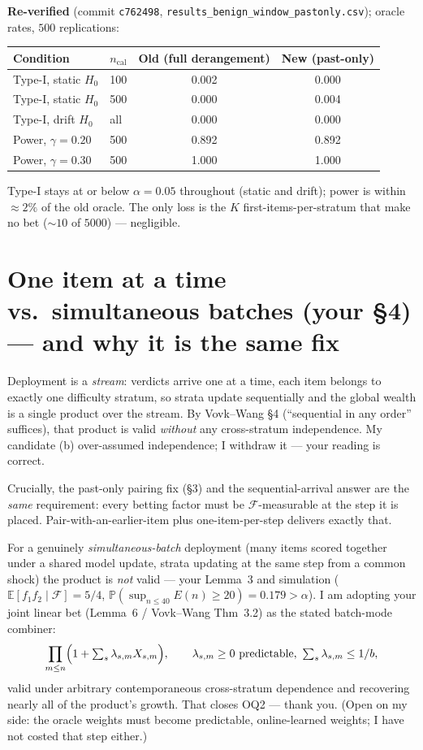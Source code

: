 \documentclass[11pt]{article}
\begin{document}
\textbf{Re-verified} (commit \texttt{c762498}, \texttt{results\_benign\_window\_pastonly.csv}); oracle rates, $500$ replications:
\begin{center}
\begin{tabular}{llcc}
\toprule
Condition & $n_{\mathrm{cal}}$ & Old (full derangement) & New (past-only) \\
\midrule
Type-I, static $H_0$ & 100 & 0.002 & 0.000 \\
Type-I, static $H_0$ & 500 & 0.000 & 0.004 \\
Type-I, drift $H_0$  & all & 0.000 & 0.000 \\
Power, $\gamma=0.20$ & 500 & 0.892 & 0.892 \\
Power, $\gamma=0.30$ & 500 & 1.000 & 1.000 \\
\bottomrule
\end{tabular}
\end{center}
Type-I stays at or below $\alpha=0.05$ throughout (static and drift); power is within $\approx 2\%$ of the old oracle. The only loss is the $K$ first-items-per-stratum that make no bet ($\sim 10$ of $5000$) --- negligible.

\section{One item at a time vs.\ simultaneous batches (your \S4) --- and why it is the same fix}
Deployment is a \emph{stream}: verdicts arrive one at a time, each item belongs to exactly one difficulty stratum, so strata update sequentially and the global wealth is a single product over the stream. By Vovk--Wang \S4 (``sequential in any order'' suffices), that product is valid \emph{without} any cross-stratum independence. My candidate (b) over-assumed independence; I withdraw it --- your reading is correct.

Crucially, the past-only pairing fix (\S3) and the sequential-arrival answer are the \emph{same} requirement: every betting factor must be $\mathcal{F}$-measurable at the step it is placed. Pair-with-an-earlier-item plus one-item-per-step delivers exactly that.

For a genuinely \emph{simultaneous-batch} deployment (many items scored together under a shared model update, strata updating at the same step from a common shock) the product is \emph{not} valid --- your Lemma~3 and simulation ($\mathbb{E}[f_1 f_2\mid\mathcal{F}]={5}/{4}$, $\mathbb{P}(\sup_{n\le40}E(n)\ge 20)=0.179>\alpha$). I am adopting your joint linear bet (Lemma~6 / Vovk--Wang Thm~3.2) as the stated batch-mode combiner:
\[
  \prod_{m\le n}\Bigl(1+\textstyle\sum_s \lambda_{s,m}X_{s,m}\Bigr),
  \qquad \lambda_{s,m}\ge 0 \ \text{predictable}, \ \textstyle\sum_s\lambda_{s,m}\le 1/b,
\]
valid under arbitrary contemporaneous cross-stratum dependence and recovering nearly all of the product's growth. That closes OQ2 --- thank you. (Open on my side: the oracle weights must become predictable, online-learned weights; I have not costed that step either.)
\end{document}
